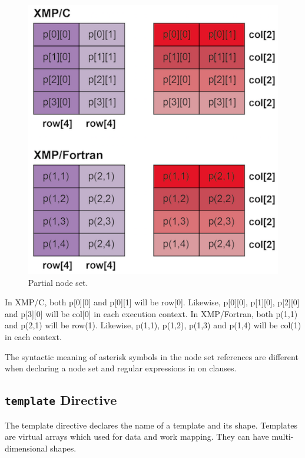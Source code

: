 \begin{figure}
  \centering
  \includegraphics{figs/row_col.png}
  \caption{Partial node set.}
  \label{fig:partial}
\end{figure}

In XMP/C, both p[0][0] and p[0][1] will be row[0]. Likewise, p[0][0],
p[1][0], p[2][0] and p[3][0] will be col[0] in each execution
context. In XMP/Fortran, both p(1,1) and p(2,1) will be
row(1). Likewise, p(1,1), p(1,2), p(1,3) and p(1,4) will be col(1) in
each context.

\begin{mynote}
The syntactic meaning of asterisk symbols in the
node set references are different when declaring a node set and regular
expressions in on clauses.
\end{mynote}


\subsection{{\tt template} Directive}

The template directive declares the name of a template and its
shape. Templates are virtual arrays which used for data and work
mapping. They can have multi-dimensional shapes.

